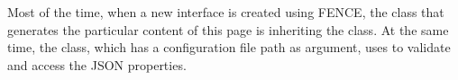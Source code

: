 Most of the time, when a new interface is created using FENCE, the class that generates the particular content of this page is inheriting the  class.
At the same time, the  class, which has a configuration file path as argument, uses  to validate and access the JSON properties.

